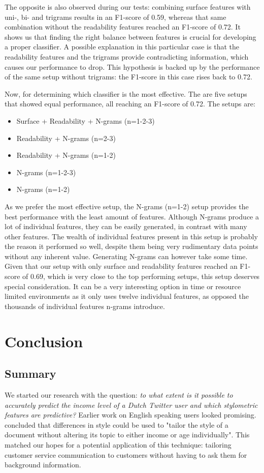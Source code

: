 \documentclass[
10pt, %
a4paper, %
oneside, %
headinclude,footinclude, %
] {book}%
\begin{document}
The opposite is also observed during our tests: combining surface features with uni-, bi- and trigrams results in an F1-score of 0.59, whereas that same combination without the readability features reached an F1-score of 0.72. It shows us that finding the right balance between features is crucial for developing a proper classifier. A possible explanation in this particular case is that the readability features and the trigrams provide contradicting information, which causes our performance to drop. This hypothesis is backed up by the performance of the same setup without trigrams: the F1-score in this case rises back to 0.72.

Now, for determining which classifier is the most effective. The are five setups that showed equal performance, all reaching an F1-score of 0.72. The setups are:
\begin{itemize}
\item Surface + Readability + N-grams (n=1-2-3)
\item Readability + N-grams (n=2-3)
\item Readability + N-grams (n=1-2)
\item N-grams (n=1-2-3)
\item N-grams (n=1-2)
\end{itemize}

As we prefer the most effective setup, the N-grams (n=1-2) setup provides the best performance with the least amount of features. Although N-grams produce a lot of individual features, they can be easily generated, in contrast with many other features. The wealth of individual features present in this setup is probably the reason it performed so well, despite them being very rudimentary data points without any inherent value.
Generating N-grams can however take some time. Given that our setup with only surface and readability features reached an F1-score of 0.69, which is very close to the top performing setups, this setup deserves special consideration. It can be a very interesting option in time or resource limited environments as it only uses twelve individual features, as opposed the thousands of individual features n-grams introduce.



\chapter{Conclusion}
\section{Summary}
We started our research with the question: \textit{to what extent is it possible to accurately predict the income level of a Dutch Twitter user and which stylometric features are predictive?} Earlier work on English speaking users looked promising. \citet{flekova} concluded that differences in style could be used to "tailor the style of a document without altering its topic to either income or age individually". This matched our hopes for a potential application of this technique: tailoring customer service communication to customers without having to ask them for background information.
\end{document}
